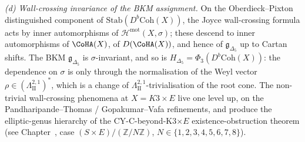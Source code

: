 \begin{remark}[Motivic wall-crossing, Behrend specialisation, and the \texorpdfstring{$\Eone$}{E1}/\texorpdfstring{$\Etwo$}{E2} boundary at \texorpdfstring{$d=3$}{d=3}]
\emph{(d) Wall-crossing invariance of the BKM assignment.} On the
Oberdieck--Pixton distinguished component of
$\mathrm{Stab}(D^b\mathrm{Coh}(X))$, the Joyce wall-crossing formula
acts by inner automorphisms of $\mathcal H^{\mathrm{mot}}(X,\sigma)$;
these descend to inner automorphisms of $\CoHA(X)$, of
$D(\CoHA(X))$, and hence of $\mathfrak g_{\Delta_5}$ up to Cartan
shifts. The BKM $\mathfrak g_{\Delta_5}$ is $\sigma$-invariant, and
so is $H_{\Delta_5}=\Phi_3(D^b\mathrm{Coh}(X))$: the dependence on
$\sigma$ is only through the normalisation of the Weyl vector
$\rho\in(\Lambda_{\mathrm{II}}^{2,1})^*$, which is a change of
$\Lambda_{\mathrm{II}}^{2,1}$-trivialisation of the root cone. The
non-trivial wall-crossing phenomena at $X=K3\times E$ live one level
up, on the Pandharipande--Thomas / Gopakumar--Vafa refinements, and
produce the elliptic-genus hierarchy of
the CY-C-beyond-K3$\times E$ existence-obstruction theorem (see
Chapter~\cite{VolI}, case
$(S\times E)/(\mathbb Z/N\mathbb Z)$, $N\in\{1,2,3,4,5,6,7,8\}$).
\end{remark}

